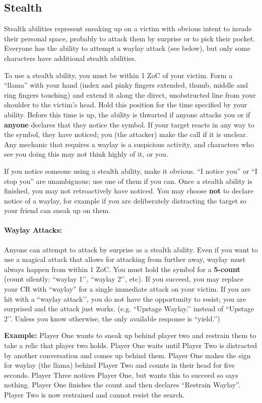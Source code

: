 \documentclass[sheet]{GL2020}
\begin{document}
\subsection{Stealth}

Stealth abilities represent sneaking up on a victim with obvious intent to invade their personal space, probably to attack them by surprise or to pick their pocket. Everyone has the ability to attempt a waylay attack (see below), but only some characters have additional stealth abilities.

To use a stealth ability, you must be within 1 ZoC of your victim. Form a ``llama'' with your hand (index and pinky fingers extended, thumb, middle and ring fingers touching) and extend it along the direct, unobstructed line from your shoulder to the victim's head. Hold this position for the time specified by your ability. Before this time is up, the ability is thwarted if anyone attacks you or if \textbf{anyone} declares that they notice the symbol. If your target reacts in any way to the symbol, they have noticed; you (the attacker) make the call if it is unclear. Any mechanic that requires a waylay is a suspicious activity, and characters who see you doing this may not think highly of it, or you.

If you notice someone using a stealth ability, make it obvious. ``I notice you'' or “I stop you” are unambiguous; use one of them if you can. Once a stealth ability is finished, you may not retroactively have noticed. You may choose \textbf{not} to declare notice of a waylay, for example if you are deliberately distracting the target so your friend can sneak up on them. 


\paragraph{Waylay Attacks:} Anyone can attempt to attack by surprise as a stealth ability. Even if you want to use a magical attack that allows for attacking from further away, waylay must always happen from within 1 ZoC. You must hold the symbol for a \textbf{5-count} (count silently: ``waylay 1’’, ``waylay 2’’, etc). If you succeed, you may replace your CR with ``waylay'' for a single immediate attack on your victim. If you are hit with a ``waylay attack'’, you do not have the opportunity to resist; you are surprised and the attack just works. (e.g. ``Upstage Waylay.’’ instead of ``Upstage 2’’. Unless you know otherwise, the only available response is ``yield.’’)


\textbf{Example:}\newline
Player One wants to sneak up behind player two and restrain them to take a relic that player two holds. Player One waits until Player Two is distracted by another conversation and comes up behind them. Player One makes the sign for waylay (the llama) behind Player Two and counts in their head for five seconds. Player Three notices Player One, but wants this to succeed so says nothing. Player One finishes the count and then declares “Restrain Waylay”. Player Two is now restrained and cannot resist the search.    
\end{document}
